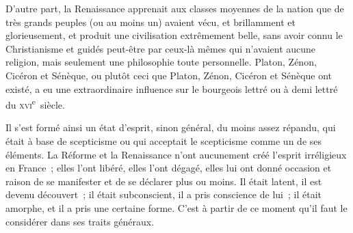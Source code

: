 \documentclass[french,twoside]{book} %
\newcommand{\astertri}{\medskip\par\centerline{\color{rubric}\large\selectfont{\syms ✻\,✻\,✻}}\medskip\par}%
\begin{document}
D’autre part, la Renaissance apprenait aux classes moyennes de la nation que de très grands peuples (ou au moins un) avaient vécu, et brillamment et glorieusement, et produit une civilisation extrêmement belle, sans avoir connu le Christianisme et guidés peut-être par ceux-là mêmes qui n’avaient aucune religion, mais seulement une philosophie toute personnelle. Platon, Zénon, Cicéron et Sénèque, ou plutôt ceci que Platon, Zénon, Cicéron et Sénèque ont existé, a eu une extraordinaire influence sur le bourgeois lettré ou à demi lettré du \textsc{xvi}\textsuperscript{e} siècle.\par
Il s’est formé ainsi un état d’esprit, sinon général, du moins assez répandu, qui était à base de scepticisme ou qui acceptait le scepticisme comme un de ses éléments. La Réforme et la Renaissance n’ont aucunement créé l’esprit irréligieux en France ; elles l’ont libéré, elles l’ont dégagé, elles lui ont donné occasion et raison de se manifester et de se déclarer plus ou moins. Il était latent, il est devenu découvert ; il était subconscient,  il a pris conscience de lui ; il était amorphe, et il a pris une certaine forme. C’est à partir de ce moment qu’il faut le considérer dans ses traits généraux.\par

\astertri
\end{document}

